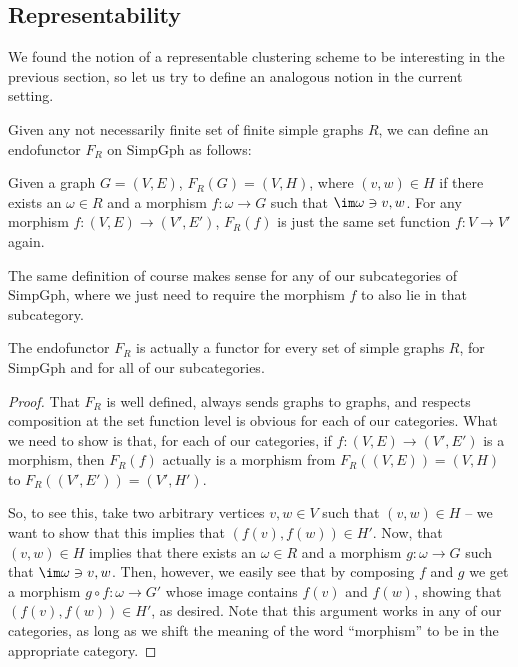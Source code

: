 \documentclass[a4paper,reqno,oneside]{article} %
\begin{document}
\subsection{Representability}
We found the notion of a representable clustering scheme to be interesting in the previous section, so let us try to define an analogous notion in the current setting.

\begin{definition}
Given any not necessarily finite set of finite simple graphs $R$, we can define an endofunctor $F_R$ on $\mathrm{SimpGph}$ as follows:

Given a graph $G = (V,E)$, $F_R(G) = (V, H)$, where $(v,w) \in H$ if there exists an $\omega \in R$ and a morphism $f: \omega \to G$ such that $\im \omega \ni v, w$. For any morphism $f: (V,E) \to (V',E')$, $F_R(f)$ is just the same set function $f: V \to V'$ again.

The same definition of course makes sense for any of our subcategories of $\mathrm{SimpGph}$, where we just need to require the morphism $f$ to also lie in that subcategory.
\end{definition}

\begin{lemma}\label{lemma_repr_endofunctor_is_functor}
The endofunctor $F_R$ is actually a functor for every set of simple graphs $R$, for $\mathrm{SimpGph}$ and for all of our subcategories.

\begin{proof}
That $F_R$ is well defined, always sends graphs to graphs, and respects composition at the set function level is obvious for each of our categories. What we need to show is that, for each of our categories, if $f: (V,E) \to (V',E')$ is a morphism, then $F_R(f)$ actually is a morphism from $F_R((V,E)) = (V,H)$ to $F_R((V',E')) = (V',H')$.

So, to see this, take two arbitrary vertices $v, w \in V$ such that $(v,w) \in H$ -- we want to show that this implies that $(f(v),f(w)) \in H'$. Now, that $(v,w) \in H$ implies that there exists an $\omega \in R$ and a morphism $g: \omega \to G$ such that $\im \omega \ni v, w$. Then, however, we easily see that by composing $f$ and $g$ we get a morphism $g \circ f: \omega \to G'$ whose image contains $f(v)$ and $f(w)$, showing that $(f(v),f(w)) \in H'$, as desired. Note that this argument works in any of our categories, as long as we shift the meaning of the word ``morphism'' to be in the appropriate category.
\end{proof}
\end{lemma}
\end{document}
